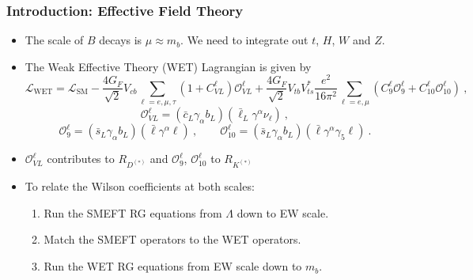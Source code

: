 \documentclass[mathserif, 10pt]{beamer}
\begin{document}
\begin{frame}\frametitle{Introduction: Effective Field Theory}
\begin{itemize}

\item The scale of $B$ decays is $\mu \approx m_b$. We need to integrate out $t$, $H$, $W$ and $Z$.

\item The Weak Effective Theory (WET) Lagrangian is given by
{\scriptsize $$\mathcal{L}_{\text{WET}} = \mathcal{L}_\mathrm{SM} -\frac{4 G_F}{\sqrt{2}}V_{cb}\sum_{\ell = e, \mu, \tau} (1 + C_{VL}^\ell) \mathcal{O}_{VL}^\ell + \frac{4G_F}{\sqrt{2}}V_{tb}V_{ts}^*\frac{e^2}{16\pi^2}\sum_{\ell=e,\mu} (C_9^\ell \mathcal{O}_9^\ell  + C_{10}^\ell \mathcal{O}_{10}^\ell) \ ,$$}
{ $$\mathcal{O}_{VL}^\ell = (\bar{c}_L \gamma_\alpha b_L)(\bar{\ell}_L \gamma^\alpha \nu_\ell)\ ,$$ $$\mathcal{O}_9^\ell = (\bar{s}_L \gamma_\alpha b_L)(\bar{\ell} \gamma^\alpha \ell)\ , \qquad \mathcal{O}_{10}^\ell = (\bar{s}_L \gamma_\alpha b_L)(\bar{\ell} \gamma^\alpha \gamma_5 \ell) \ .$$}

\item $\mathcal{O}_{VL}^\ell$ contributes to $R_{D^{(*)}}$ and $\mathcal{O}_9^\ell$, $\mathcal{O}_{10}^\ell$ to $R_{K^{(*)}}$

\item To relate the Wilson coefficients at both scales:
\begin{enumerate}
    \item Run the SMEFT RG equations from $\Lambda$ down to EW scale.
    \item Match the SMEFT operators to the WET operators.
    \item Run the WET RG equations from EW scale down to $m_b$.
\end{enumerate}
    
\end{itemize}
\end{frame}
\end{document}
